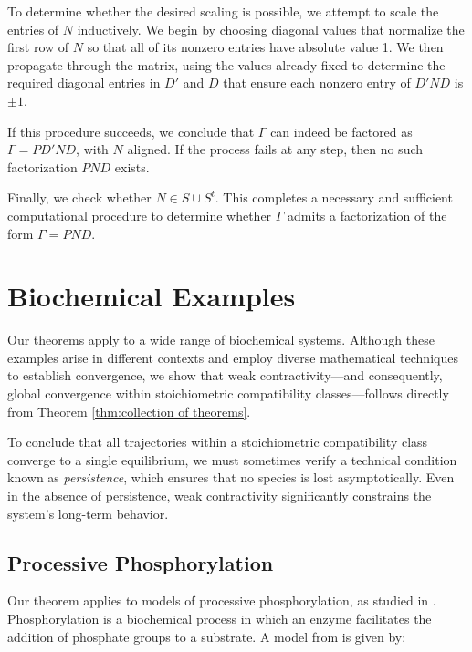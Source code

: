 \documentclass{article}
\begin{document}
To determine whether the desired scaling is possible, we attempt to scale the entries of \( N \) inductively. We begin by choosing diagonal values that normalize the first row of \( N \) so that all of its nonzero entries have absolute value 1. We then propagate through the matrix, using the values already fixed to determine the required diagonal entries in \( D' \) and \( D \) that ensure each nonzero entry of \( D'ND \) is \( \pm 1 \).

If this procedure succeeds, we conclude that \( \Gamma \) can indeed be factored as \( \Gamma = P D' N D \), with \( N \) aligned. If the process fails at any step, then no such factorization \( PND \) exists.

Finally, we check whether \( N \in S \cup S^t \). This completes a necessary and sufficient computational procedure to determine whether \( \Gamma \) admits a factorization of the form \( \Gamma = PND \).



\section{Biochemical Examples}
\label{sec:biochemical examples}

Our theorems apply to a wide range of biochemical systems. Although these examples arise in different contexts and employ diverse mathematical techniques to establish convergence, we show that weak contractivity—and consequently, global convergence within stoichiometric compatibility classes—follows directly from Theorem \ref{thm:collection of theorems}. 

To conclude that all trajectories within a stoichiometric compatibility class converge to a single equilibrium, we must sometimes verify a technical condition known as \textit{persistence}, which ensures that no species is lost asymptotically. Even in the absence of persistence, weak contractivity significantly constrains the system’s long-term behavior.




\subsection{Processive Phosphorylation}

Our theorem applies to models of processive phosphorylation, as studied in \cite{EITHUN20171}. Phosphorylation is a biochemical process in which an enzyme facilitates the addition of phosphate groups to a substrate. A model from \cite{EITHUN20171} is given by:
\end{document}
